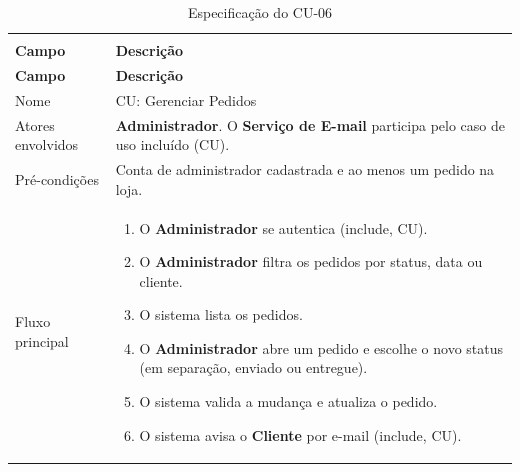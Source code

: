 \documentclass[12pt,a4paper]{article}
\begin{document}
{\setlength{\arrayrulewidth}{0.3pt}\renewcommand{\arraystretch}{1.1}\small{}
\begin{xltabular}{\textwidth}{>{\raggedright\arraybackslash}p{3.4cm}|>{\raggedright\arraybackslash}X}
\caption{Especificação do CU-06}\\
\toprule{}
\textbf{Campo} & \textbf{Descrição}\\ \midrule{}
\endfirsthead
{}\toprule{}
\textbf{Campo} & \textbf{Descrição}\\ \midrule{}
\endhead
\endlastfoot
Nome & CU: Gerenciar Pedidos\\ \hline
Atores envolvidos & \textbf{Administrador}. O \textbf{Serviço de E-mail} participa pelo caso de uso incluído (CU).\\ \hline
Pré-condições & Conta de administrador cadastrada e ao menos um pedido na loja.\\ \hline
Fluxo principal & \begin{enumerate}[nosep,leftmargin=1.4em,label=\arabic*.,before=\vspace{-\baselineskip},after=\vspace{-0.4\baselineskip}]\item O \textbf{Administrador} se autentica (include, CU). \item O \textbf{Administrador} filtra os pedidos por status, data ou cliente. \item O sistema lista os pedidos. \item O \textbf{Administrador} abre um pedido e escolhe o novo status (em separação, enviado ou entregue). \item O sistema valida a mudança e atualiza o pedido. \item O sistema avisa o \textbf{Cliente} por e-mail (include, CU). \end{enumerate}\\ \hline

\end{xltabular}}
\end{document}
